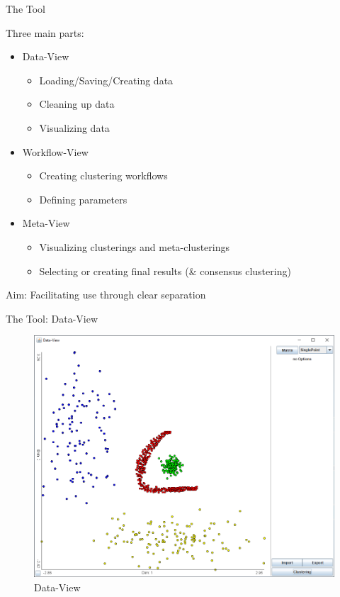\documentclass[aspectratio=169]{beamer}
\begin{document}
\begin{frame}{The Tool}
	
	Three main parts:
	\begin{itemize}
		\item Data-View
		\begin{itemize}
			\item Loading/Saving/Creating data
			\item Cleaning up data
			\item Visualizing data
		\end{itemize}
		\item Workflow-View
		\begin{itemize}
			\item Creating clustering workflows
			\item Defining parameters
		\end{itemize}
		\item Meta-View
		\begin{itemize}
			\item Visualizing clusterings and meta-clusterings
			\item Selecting or creating final results (\& consensus clustering)
		\end{itemize}
	\end{itemize}

Aim: Facilitating use through clear separation

\end{frame}

\begin{frame}{The Tool: Data-View}
	
	\begin{figure}
	  \centering
	    \includegraphics[width=.64\textwidth]{unob_fix}
	  \caption{Data-View}
	  \label{fig:data-view}
	\end{figure}

\end{frame}
\end{document}
